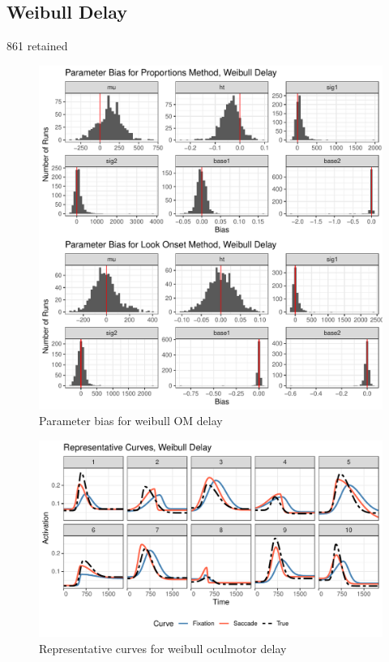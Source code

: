 \documentclass{article}
\begin{document}
\subsection{Weibull Delay}

861 retained

\begin{figure}[H]
\centering
\includegraphics{dg_weibull_delay_par_bias.pdf}
\caption{Parameter bias for weibull OM delay}
\label{fig:par_bias_weibull_delay}
\end{figure}

\begin{figure}[H]
\centering
\includegraphics{dg_rep_curves_weibull_delay.pdf}
\caption{Representative curves for weibull oculmotor delay}
\label{fig:rep_curves_weibull_delay}
\end{figure}
\end{document}
